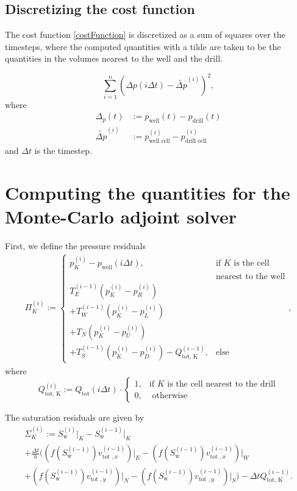 \documentclass[conference]{IEEEtran}
\begin{document}
\subsection{Discretizing the cost function}
The cost function \eqref{costFunction} is discretized as a sum of squares over the timesteps, where the computed quantities with a tilde are taken to be the quantities in the volumes nearest to the well and the drill.

\begin{equation}
\sum_{i=1}^{n} (\Delta p(i\Delta t) - \tilde{\Delta p}^{(i)})^2,
\end{equation}
where
\begin{align}
\Delta_p(t) &:= p_\text{well}(t) - p_\text{drill}(t) \\
\tilde{\Delta p}^{(i)} &:= p_\text{well cell}^{(i)} - p_\text{drill cell}^{(i)}
\end{align}
and $\Delta t$ is the timestep.

\section{Computing the quantities for the Monte-Carlo adjoint solver}

First, we define the pressure residuals
\begin{multline}
\Pi_K^{(i)} := \begin{cases} p_K^{(i)} - p_\text{well}(i\Delta t), & \text{if } K \text{ is the cell}\\&\text{nearest to the well}\\T_E^{(i-1)} (p_K^{(i)} - p_R^{(i)}) \\+ T_W^{(i-1)} (p_K^{(i)} - p_L^{(i)}) \\+ T_N ( p_K^{(i)} - p_U^{(i)}) \\+ T_S^{(i-1)} (p_K^{(i)} - p_D^{(i)}) - Q_\text{tot, K}^{(i-1)}, & \text{else}\end{cases}, 
\end{multline}
where
\begin{equation}
Q_\text{tot, K}^{(i)} := Q_\text{tot}(i\Delta t) \cdot \begin{cases} 1, &\text{if } K \text{ is the cell nearest to the drill}\\0, &\text{ otherwise} \end{cases}
\end{equation}

The saturation residuals are given by
\begin{multline}
\Sigma_K^{(i)} := S_\text{w}^{(i)}\lvert_K - S_\text{w}^{(i-1)}\lvert_{K} \\+ \frac{\Delta t}{h} \biggr((f(S_\text{w}^{(i-1)})v_{\text{tot }, x}^{(i-1)})\lvert_E - (f(S_\text{w}^{(i-1)})v_{\text{tot }, x}^{(i-1)})\lvert_W \\+ (f(S_\text{w}^{(i-1)})v_{\text{tot }, y}^{(i-1)})\lvert_N - (f(S_\text{w}^{(i-1)})v_{\text{tot }, y}^{(i-1)})\lvert_S\biggr) - \Delta t Q_\text{tot, K}^{(i-1)}.
\end{multline}
\end{document}
